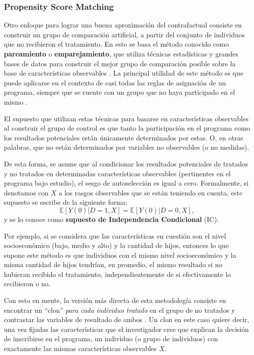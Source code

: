 \documentclass[../../main.tex]{subfiles}
\begin{document}
\subsubsection{Propensity Score Matching}
Otro enfoque para lograr una buena aproximación del contrafactual consiste en construir un
grupo de comparación artificial, a partir del conjunto de individuos que no recibieron el
tratamiento. En esto se basa el método conocido como \textbf{pareamiento} o
\textbf{emparejamiento}, que utiliza técnicas estadísticas y grandes bases de datos para
construir el mejor grupo de comparación posible sobre la base de características
observables \cite{gertler-2016}. La principal utilidad de este método es que puede
aplicarse en el contexto de casi todas las reglas de asignación de un programa, siempre
que se cuente con un grupo que no haya participado en el mismo \cite{gertler-2016}.

El supuesto que utilizan estas técnicas para basarse en características observables al
construir el grupo de control es que tanto la participación en el programa como los
resultados potenciales están únicamente determinados por estas. O, en otras palabras, que
no están determinados por variables no observables (o no medidas).

De esta forma, se asume que al condicionar los resultados potenciales de tratados y no
tratados en determinadas características observables (pertinentes en el programa bajo
estudio), el sesgo de autoselección es igual a cero. Formalmente, si denotamos con \(X\) a
los rasgos observables que se están teniendo en cuenta, este supuesto se escribe de la
siguiente forma\footnotemark :
\begin{equation}
    \mathbb{E}\left[Y(0)|D=1, X\right] = \mathbb{E}\left[Y(0)|D=0, X\right],
\end{equation}
y se lo conoce como \textbf{supuesto de Independencia Condicional} (IC).

Por ejemplo, si se considera que las características en cuestión son el nivel
socioeconómico (bajo, medio y alto) y la cantidad de hijos, entonces lo que supone este
método es que individuos con el mismo nivel socioeconómico y la misma cantidad de hijos
tendrían, en promedio, el mismo resultado si no hubieran recibido el tratamiento,
independientemente de si efectivamente lo recibieron o no.

Con esto en mente, la versión más directa de esta metodología consiste en encontrar un
``clon'' \textit{para cada individuo tratado} en el grupo de no tratados y contrastar las
variables de resultado de ambos \cite{bernal}. Un clon en este caso quiere decir, una vez
fijadas las características que el investigador cree que explican la decisión de
inscribirse en el programa, un individuo (o grupo de individuos) con exactamente las
mismas características observables \(X\).
\end{document}
